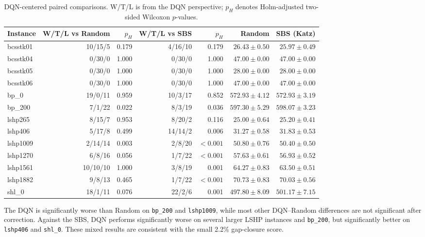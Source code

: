\documentclass[runningheads]{llncs}
\begin{document}
\begin{table}[t]
\centering
\caption{DQN-centered paired comparisons. W/T/L is from the DQN perspective; $p_H$ denotes Holm-adjusted two-sided Wilcoxon $p$-values.}
\label{tab:posthoc}
\scriptsize
\begin{tabular}{lrrrrrr}
\toprule
Instance & W/T/L vs Random & $p_H$ & W/T/L vs SBS & $p_H$ & Random & SBS (Katz)\\
\midrule
bcsstk01 & 10/15/5 & 0.179 & 4/16/10 & 0.179 & $26.43\pm0.50$ & $25.97\pm0.49$\\
bcsstk04 & 0/30/0 & 1.000 & 0/30/0 & 1.000 & $47.00\pm0.00$ & $47.00\pm0.00$\\
bcsstk05 & 0/30/0 & 1.000 & 0/30/0 & 1.000 & $28.00\pm0.00$ & $28.00\pm0.00$\\
bcsstk06 & 0/30/0 & 1.000 & 0/30/0 & 1.000 & $47.00\pm0.00$ & $47.00\pm0.00$\\
bp\_0 & 19/0/11 & 0.959 & 10/3/17 & 0.852 & $572.93\pm4.12$ & $572.93\pm3.19$\\
bp\_200 & 7/1/22 & 0.022 & 8/3/19 & 0.036 & $597.30\pm5.29$ & $598.07\pm3.23$\\
lshp265 & 8/15/7 & 0.953 & 8/20/2 & 0.116 & $25.00\pm0.64$ & $25.20\pm0.41$\\
lshp406 & 5/17/8 & 0.499 & 14/14/2 & 0.006 & $31.27\pm0.58$ & $31.83\pm0.53$\\
lshp1009 & 2/14/14 & 0.003 & 2/8/20 & $<0.001$ & $50.80\pm0.76$ & $50.40\pm0.50$\\
lshp1270 & 6/8/16 & 0.056 & 1/7/22 & $<0.001$ & $57.63\pm0.61$ & $56.93\pm0.52$\\
lshp1561 & 10/10/10 & 1.000 & 3/8/19 & 0.001 & $64.27\pm0.83$ & $63.50\pm0.51$\\
lshp1882 & 9/8/13 & 0.465 & 1/7/22 & $<0.001$ & $70.73\pm0.83$ & $70.03\pm0.56$\\
shl\_0 & 18/1/11 & 0.076 & 22/2/6 & 0.001 & $497.80\pm8.09$ & $501.17\pm7.15$\\
\bottomrule
\end{tabular}
\end{table}

The DQN is significantly worse than Random on \texttt{bp\_200} and \texttt{lshp1009}, while most other DQN--Random differences are not significant after correction. Against the SBS, DQN performs significantly worse on several larger LSHP instances and \texttt{bp\_200}, but significantly better on \texttt{lshp406} and \texttt{shl\_0}. These mixed results are consistent with the small 2.2\% gap-closure score.
\end{document}
